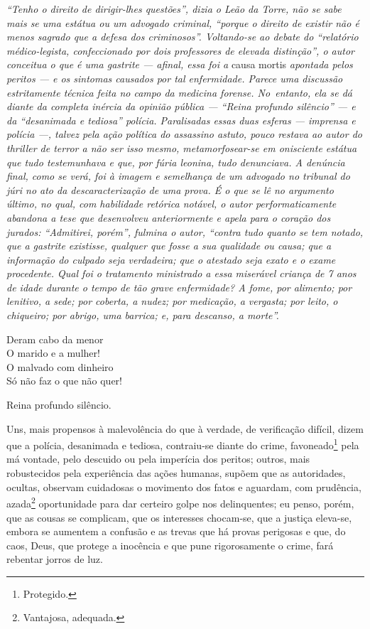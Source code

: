 {\begin{resumo}
\emph{``Tenho o direito de dirigir-lhes questões'', dizia o Leão da
Torre, não se sabe mais se uma estátua ou um advogado criminal,
``porque o direito de existir não é menos sagrado que a defesa dos
criminosos''. Voltando-se ao debate do ``relatório médico-legista,
confeccionado por dois professores de elevada distinção'', o autor
conceitua o que é uma gastrite --- afinal, essa foi a} causa mortis
\emph{apontada pelos peritos --- e os sintomas causados por tal
enfermidade. Parece uma discussão estritamente técnica feita no campo da
medicina forense. No~entanto, ela se dá diante da completa inércia da
opinião pública --- ``Reina profundo silêncio'' --- e da ``desanimada
e tediosa'' polícia. Paralisadas essas duas esferas --- imprensa e polícia
---, talvez pela ação política do assassino astuto, pouco restava ao
autor do thriller de terror a não ser isso mesmo, metamorfosear-se em
onisciente estátua que tudo testemunhava e que, por fúria leonina, tudo
denunciava. A denúncia final, como se verá, foi à imagem e semelhança de
um advogado no tribunal do júri no ato da descaracterização de uma
prova. É o que se lê no argumento último, no qual, com habilidade
retórica notável, o autor performaticamente abandona a tese que
desenvolveu anteriormente e apela para o coração dos jurados:
``Admitirei, porém'', fulmina o autor, ``contra tudo quanto se tem notado,
que a gastrite existisse, qualquer que fosse a sua qualidade ou causa;
que a informação do culpado seja verdadeira; que o atestado seja exato e
o exame procedente. Qual foi o tratamento ministrado a essa miserável
criança de 7 anos de idade durante o tempo de tão grave enfermidade? A
fome, por alimento; por lenitivo, a sede; por coberta, a nudez; por
medicação, a vergasta; por leito, o chiqueiro; por abrigo, uma barrica;
e, para descanso, a morte''. }
\end{resumo}\pagebreak

\epigraph{Deram cabo da menor\\
O marido e a mulher!\\
O malvado com dinheiro\\
Só não faz o que não quer!}{}

\noindent{}Reina profundo silêncio.

Uns, mais propensos à malevolência do que à verdade, de verificação
difícil, dizem que a polícia, desanimada e tediosa, contraiu-se diante
do crime, favoneado\footnote{Protegido.} pela má vontade, pelo
descuido ou pela imperícia dos peritos; outros, mais robustecidos pela
experiência das ações humanas, supõem que as autoridades, ocultas,
observam cuidadosas o movimento dos fatos e aguardam, com prudência,
azada\footnote{Vantajosa, adequada.} oportunidade para dar certeiro
golpe nos delinquentes; eu penso, porém, que as cousas se complicam, que
os interesses chocam-se, que a justiça eleva-se, embora se aumentem a
confusão e as trevas que há provas perigosas e que, do caos, Deus, que
protege a inocência e que pune rigorosamente o crime, fará rebentar
jorros de luz.

}
